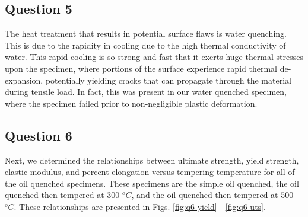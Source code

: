 \documentclass{article}
\begin{document}
\subsection*{Question 5}
The heat treatment that results in potential surface flaws is water quenching. This is due to the rapidity in cooling due to the high thermal conductivity of water. This rapid cooling is so strong and fast that it exerts huge thermal stresses upon the specimen, where portions of the surface experience rapid thermal de-expansion, potentially yielding cracks that can propagate through the material during tensile load. In fact, this was present in our water quenched specimen, where the specimen failed prior to non-negligible plastic deformation. 

\subsection*{Question 6}
Next, we determined the relationships between ultimate strength, yield strength, elastic modulus, and percent elongation versus tempering temperature for all of the oil quenched specimens. These specimens are the simple oil quenched, the oil quenched then tempered at 300 $^oC$, and the oil quenched then tempered at 500 $^oC$. These relationships are presented in Figs. \ref{fig:q6-yield} - \ref{fig:q6-uts}.
\end{document}
